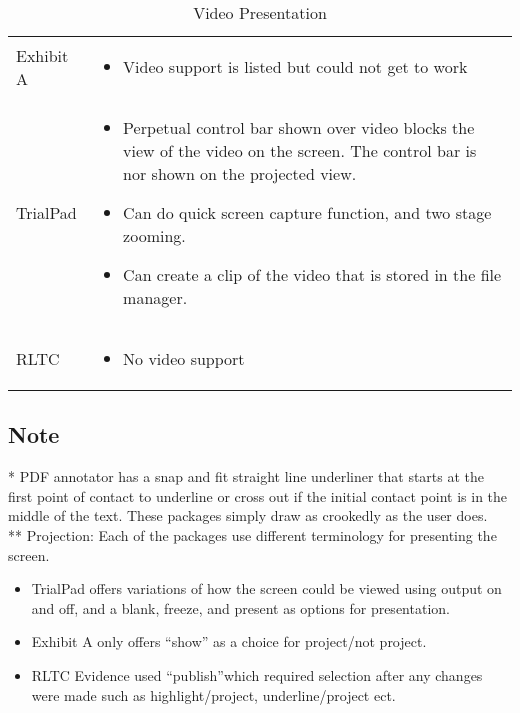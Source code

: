 \begin{center}
\begin{table}[htbp]
\label{tab:Video}
  \centering
  \caption{Video Presentation}
    \begin{tabular}{|p{}|p{}|}
    \hline
    \rowcolor{lightgrey}\multicolumn{2}{c}{Video Presentation} \\
    \hline
    Exhibit A &
    \begin{itemize}
      \item Video support is listed but could not get to work
    \end{itemize}\\
    \hline
    TrialPad &
    \begin{itemize}
      \item Perpetual control bar shown over video blocks the view of the video on the screen. The control bar is nor shown on the projected view.
      \item [\color{green}\tick]\color{black}Can do quick screen capture function, and two stage zooming.
      \item [\color{green}\tick]\color{black}Can create a clip of the video that is stored in the file manager.
     
    \end{itemize}\\
    \hline
    RLTC &
    \begin{itemize}
      \item [\color{red}\cross]\color{black} No video support  
    \end{itemize}\\
    \hline
\end{tabular}
\end{table}
\end{center}

\subsection{Note}
* PDF annotator has a snap and fit straight line underliner that starts at the first point of contact to underline or cross out if the initial contact point is in the middle of the text. These packages simply draw as crookedly as the user does.\\

** Projection: Each of the packages use different terminology for presenting the screen.
\begin{itemize}
  \item TrialPad offers variations of how the screen could be viewed using output on and off, and a blank, freeze, and present as options for presentation. 
  \item Exhibit A only offers ``show'' as a choice for project/not project.
  \item RLTC Evidence used ``publish''which required selection after any changes were made such as highlight/project, underline/project ect.
\end{itemize}

